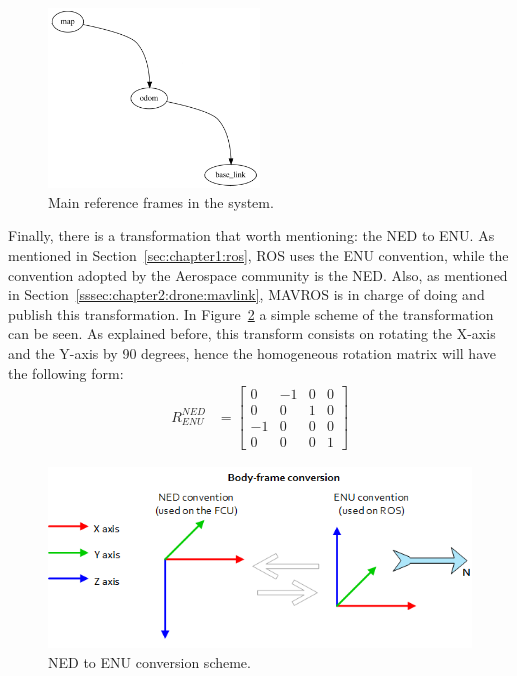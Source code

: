\begin{figure}[h]
    \centering
    \includegraphics[width=0.5\textwidth]{Figures/fig5-frames.png}
    \caption{Main reference frames in the system.}
    \label{fig:chapter2:drone:frames:frames}
\end{figure}

Finally, there is a transformation that worth mentioning: the \ac{NED} to \ac{ENU}. As mentioned in Section~\ref{sec:chapter1:ros}, ROS uses the ENU convention, while the convention adopted by the Aerospace community is the NED. Also, as mentioned in Section~\ref{sssec:chapter2:drone:mavlink}, MAVROS is in charge of doing and publish this transformation. In Figure~\ref{fig:chapter2:drone:frames:enu2ned} a simple scheme of the transformation can be seen. As explained before, this transform consists on rotating the X-axis and the Y-axis by 90 degrees, hence the homogeneous rotation matrix will have the following form:
\begin{align}
    R_{ENU}^{NED} & = \begin{bmatrix}
        0 & -1 & 0 & 0 \\
        0 & 0 & 1 & 0 \\
        -1 & 0 & 0 & 0 \\
        0 & 0 & 0 & 1
    \end{bmatrix}
\end{align}


\begin{figure}[h]
    \centering
    \includegraphics[width=\textwidth]{Figures/fig6-ned2enu.png}
    \caption{NED to ENU conversion scheme. \cite{mavros}}
    \label{fig:chapter2:drone:frames:enu2ned}
\end{figure}

